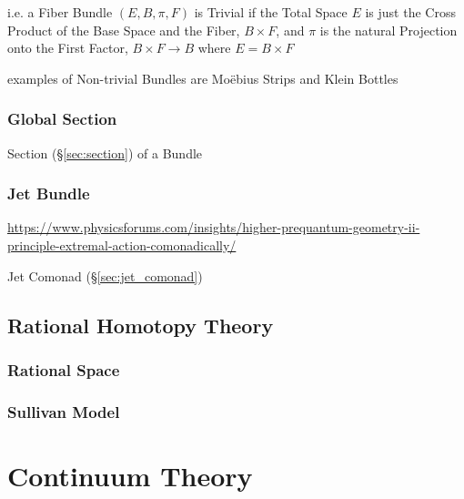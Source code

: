 i.e. a Fiber Bundle $(E, B, \pi, F)$ is Trivial if the Total Space $E$ is just
the Cross Product of the Base Space and the Fiber, $B \times F$, and $\pi$ is
the natural Projection onto the First Factor, $B \times F \rightarrow B$ where
$E = B \times F$

examples of Non-trivial Bundles are Mo\"ebius Strips and Klein Bottles



\subsubsection{Global Section}\label{sec:global_section}

Section (\S\ref{sec:section}) of a Bundle



\subsubsection{Jet Bundle}\label{sec:jet_bundle}

\url{https://www.physicsforums.com/insights/higher-prequantum-geometry-ii-principle-extremal-action-comonadically/}

\fist Jet Comonad (\S\ref{sec:jet_comonad})



\subsection{Rational Homotopy Theory}\label{sec:rational_homotopy}

\subsubsection{Rational Space}\label{sec:rational_space}

\subsubsection{Sullivan Model}\label{sec:sullivan_model}



\section{Continuum Theory}\label{sec:continuum_theory}


